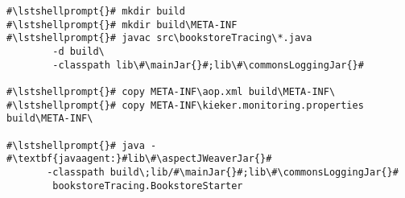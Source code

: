 \begin{lstlisting}[caption=Commands to compile and run the annotated Bookstore under Windows, label=lst:traceAnalysisCompileRunExample1Win]
#\lstshellprompt{}# mkdir build
#\lstshellprompt{}# mkdir build\META-INF
#\lstshellprompt{}# javac src\bookstoreTracing\*.java
        -d build\
        -classpath lib\#\mainJar{}#;lib\#\commonsLoggingJar{}#

#\lstshellprompt{}# copy META-INF\aop.xml build\META-INF\
#\lstshellprompt{}# copy META-INF\kieker.monitoring.properties build\META-INF\

#\lstshellprompt{}# java -#\textbf{javaagent:}#lib\#\aspectJWeaverJar{}# 
       -classpath build\;lib/#\mainJar{}#;lib\#\commonsLoggingJar{}# 
        bookstoreTracing.BookstoreStarter
\end{lstlisting}
